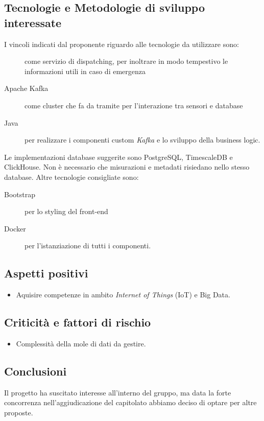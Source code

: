 \documentclass[../studio-di-fattibilita.tex]{subfiles}
\begin{document}
  \subsection{Tecnologie e Metodologie di sviluppo interessate}%
  \label{subsec:tecnologie_interessate}
  I vincoli indicati dal proponente riguardo alle tecnologie da utilizzare sono:
  \begin{description}
    \item[] come servizio di dispatching, per inoltrare in modo tempestivo le informazioni utili in caso di emergenza
    \item[Apache Kafka] come cluster che fa da tramite per l'interazione tra sensori e database
    \item[Java] per realizzare i componenti custom \textit{Kafka} e lo sviluppo della business logic.
  \end{description}
  Le implementazioni database suggerite sono PostgreSQL, TimescaleDB e ClickHouse.
  Non è necessario che misurazioni e metadati risiedano nello stesso database.
  Altre tecnologie consigliate sono:
  \begin{description}
    \item[Bootstrap] per lo styling del front-end
    \item[Docker] per l'istanziazione di tutti i componenti.
  \end{description}


  \subsection{Aspetti positivi}%
  \label{subsec:aspetti_positivi}
  \begin{itemize}
    \item Aquisire competenze in ambito \textit{Internet of Things} (IoT) e Big Data.
  \end{itemize}


  \subsection{Criticità e fattori di rischio}%
  \label{subsec:criticita_e_fattori_di_rischio}
  \begin{itemize}
    \item Complessità della mole di dati da gestire.
  \end{itemize}


  \subsection{Conclusioni}%
  \label{subsec:conclusioni}
  Il progetto ha suscitato interesse all'interno del gruppo, ma data la forte concorrenza nell'aggiudicazione del capitolato abbiamo deciso di optare per altre proposte.
\end{document}
